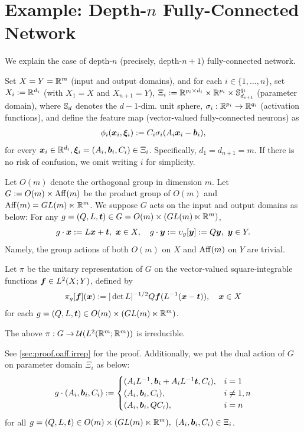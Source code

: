 \section{Example: Depth-$n$ Fully-Connected Network}\label{sec:ex-depth-n}
We explain the case of depth-$n$ (precisely, depth-$n+1$) fully-connected network. 

Set $X=Y=\mathbb{R}^m$ (input and output domains),
and for each $i \in \{1, \ldots, n\}$, set $X_i := \mathbb{R}^{d_i}$ (with $X_1 = X$ and $X_{n+1} = Y$),
$\Xi_i := \mathbb{R}^{p_i \times d_i}\times\mathbb{R}^{p_i}\times\mathbb{S}_{d_{i+1}}^{q_i}$ (parameter domain), where $\mathbb{S}_d$ denotes the $d-1$-dim. unit sphere, $\sigma_i:\mathbb{R}^{p_i} \to \mathbb{R}^{q_i}$ (activation functions), and define the feature map (vector-valued fully-connected neurons) as
\begin{align*}
    \phi_i(\xx_i,\xxi_i) := C_i \sigma_i( A_i \xx_i - \bb_i ), %
\end{align*}
for every $\bm{x}_i \in \mathbb{R}^{d_i}, \bm{\xi}_i=(A_i,\bm{b}_i,C_i) \in \Xi_i$.
Specifically, $d_1 = d_{n+1}=m$. If there is no risk of confusion, we omit writing $i$ for simplicity.

Let $O(m)$ denote the orthogonal group in dimension $m$.
Let $G := O(m) \times \operatorname{Aff}(m)$ be the product group of $O(m)$ and $\operatorname{Aff}(m) = GL(m) \ltimes \mathbb{R}^m$.
We suppose $G$ acts on the input and output domains as below: For any $g = (Q,L,\bm{t}) \in G=O(m) \times \left( GL(m) \ltimes \mathbb{R}^m \right)$,
\begin{align*}
    g \cdot \xx := L\xx+\tt, \ \xx \in X, \quad  %
    g \cdot \yy := \urep_g[\yy] := Q \yy, \ \yy \in Y.
\end{align*}
Namely, the group actions of both $O(m)$ on $X$ and $\operatorname{Aff}(m)$ on $Y$ are trivial.

Let $\pi$ be the unitary representation of $G$ on the vector-valued square-integrable functions $\bm{f} \in L^2(X;Y)$, defined by
\begin{align*}
\pi_g[\ff](\xx) := |\det L|^{-1/2} Q \ff(L^{-1}(\xx - \tt)), \quad 
\xx \in X%
\end{align*}
for each $g = (Q,L,\bm{t}) \in O(m) \times ( GL(m) \ltimes \mathbb{R}^m )$.
\begin{lemma} \label{lem:oaff.irrep}
The above $\pi : G \to \mathcal{U}(L^2(\mathbb{R}^m;\mathbb{R}^m))$ is irreducible.
\end{lemma}

See \cref{sec:proof.oaff.irrep} for the proof.
Additionally, we put the dual action of $G$ on parameter domain $\Xi_i$ as below:
\begin{align*}
    g \cdot (A_i,\bm{b}_i,C_i) :=
   \begin{cases}
    (A_i L^{-1}, \bm{b}_i + A_i L^{-1} \bm{t}, C_i), & i=1\\
    (A_i, \bm{b}_i, C_i), & i \neq 1, n\\
    (A_i, \bm{b}_i, QC_i), & i = n
   \end{cases}
\end{align*}
for all $g = (Q,L,\bm{t}) \in O(m) \times (GL(m) \ltimes \mathbb{R}^m), \ (A_i,\bm{b}_i,C_i) \in \Xi_i$.

